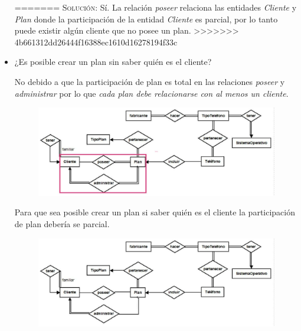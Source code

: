 \documentclass[letterpaper,11pt]{article}
\begin{document}
\begin{itemize}
=======
    \textsc{Solución:} Sí. La relación \textit{poseer} relaciona las entidades \textit{Cliente} y \textit{Plan} donde la participación de la entidad \textit{Cliente} es parcial, por lo tanto puede existir algún cliente que no posee un plan.
>>>>>>> 4b661312dd26444f16388ec1610d16278194f33c

    \item ¿Es posible crear un plan sin saber quién es el cliente?

    No debido a que la participación de plan es total en las relaciones \textit{poseer}
    y \textit{administrar} por lo que \textit{cada plan debe relacionarse con al menos
    un cliente}.
    \begin{figure}[H]
        \centering
        \includegraphics[scale=0.4]{./imagenes/modelo3a.jpg}
    \end{figure}
    Para que sea posible crear un plan si saber quién es el cliente la participación
    de plan debería se parcial.
    \begin{figure}[H]
        \centering
        \includegraphics[scale=0.4]{./imagenes/modelo3b.jpg}
    \end{figure}


\end{itemize}
\end{document}
